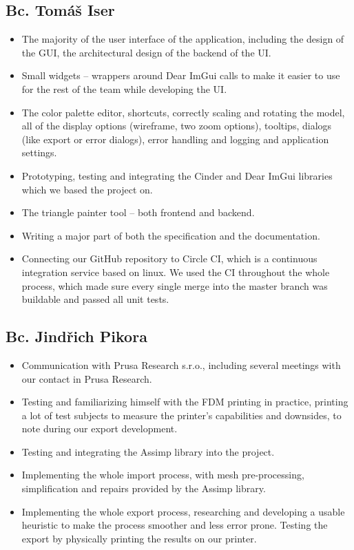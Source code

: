 \subsection{Bc. Tomáš Iser}
\begin{itemize}
\item The majority of the user interface of the application, including the design of the GUI, the architectural design of the backend of the UI.
\item Small widgets -- wrappers around Dear ImGui calls to make it easier to use for the rest of the team while developing the UI.
\item The color palette editor, shortcuts, correctly scaling and rotating the model, all of the display options (wireframe, two zoom options), tooltips, dialogs (like export or error dialogs), error handling and logging and application settings.
\item Prototyping, testing and integrating the Cinder and Dear ImGui libraries which we based the project on.
\item The triangle painter tool -- both frontend and backend.
\item Writing a major part of both the specification and the documentation.
\item Connecting our GitHub repository to Circle CI, which is a continuous integration service based on linux. We used the CI throughout the whole process, which made sure every single merge into the master branch was buildable and passed all unit tests.
\end{itemize}

\subsection{Bc. Jindřich Pikora}
\begin{itemize}
\item Communication with Prusa Research s.r.o., including several meetings with our contact in Prusa Research.
\item Testing and familiarizing himself with the FDM printing in practice, printing a lot of test subjects to measure the printer's capabilities and downsides, to note during our export development.
\item Testing and integrating the Assimp library into the project.
\item Implementing the whole import process, with mesh pre-processing, simplification and repairs provided by the Assimp library.
\item Implementing the whole export process, researching and developing a usable heuristic to make the process smoother and less error prone. Testing the export by physically printing the results on our printer.
\end{itemize}

